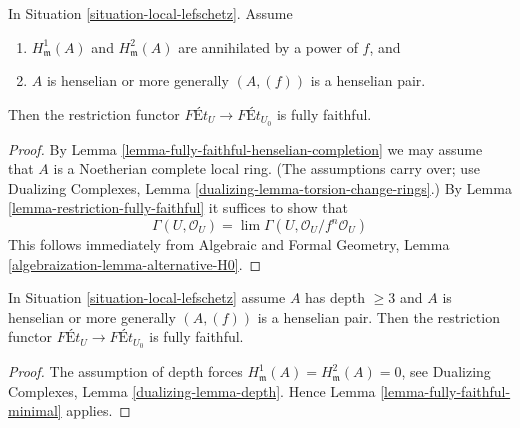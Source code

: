\begin{lemma}
\label{lemma-fully-faithful-minimal}
\begin{reference}
\cite[Corollary 1.11]{Bhatt-local}
\end{reference}
In Situation \ref{situation-local-lefschetz}. Assume
\begin{enumerate}
\item $H^1_\mathfrak m(A)$ and $H^2_\mathfrak m(A)$ are
annihilated by a power of $f$, and
\item $A$ is henselian or more generally $(A, (f))$ is a henselian pair.
\end{enumerate}
Then the restriction functor
$\textit{F\'Et}_U \longrightarrow \textit{F\'Et}_{U_0}$
is fully faithful.
\end{lemma}

\begin{proof}
By Lemma \ref{lemma-fully-faithful-henselian-completion}
we may assume that $A$ is a Noetherian complete local ring.
(The assumptions carry over; use
Dualizing Complexes, Lemma \ref{dualizing-lemma-torsion-change-rings}.)
By Lemma \ref{lemma-restriction-fully-faithful}
it suffices to show that
$$
\Gamma(U, \mathcal{O}_U) = \lim \Gamma(U, \mathcal{O}_U/f^n\mathcal{O}_U)
$$
This follows immediately from
Algebraic and Formal Geometry, Lemma \ref{algebraization-lemma-alternative-H0}.
\end{proof}

\begin{lemma}
\label{lemma-fully-faithful}
In Situation \ref{situation-local-lefschetz} assume $A$ has depth $\geq 3$
and $A$ is henselian or more generally $(A, (f))$ is a henselian pair. Then
the restriction functor
$\textit{F\'Et}_U \to \textit{F\'Et}_{U_0}$
is fully faithful.
\end{lemma}

\begin{proof}
The assumption of depth forces
$H^1_\mathfrak m(A) = H^2_\mathfrak m(A) = 0$, see
Dualizing Complexes, Lemma \ref{dualizing-lemma-depth}.
Hence Lemma \ref{lemma-fully-faithful-minimal} applies.
\end{proof}



























